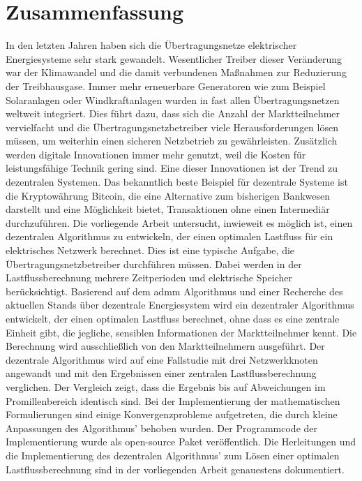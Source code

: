 \section*{Zusammenfassung}

In den letzten Jahren haben sich die Übertragungsnetze elektrischer Energiesysteme sehr stark gewandelt. Wesentlicher Treiber dieser Veränderung war der Klimawandel und die damit verbundenen Maßnahmen zur Reduzierung der Treibhausgase. Immer mehr erneuerbare Generatoren wie zum Beispiel Solaranlagen oder Windkraftanlagen wurden in fast allen Übertragungsnetzen weltweit integriert. Dies führt dazu, dass sich die Anzahl der Marktteilnehmer vervielfacht und die Übertragungsnetzbetreiber viele Herausforderungen lösen müssen, um weiterhin einen sicheren Netzbetrieb zu gewährleisten. Zusätzlich werden digitale Innovationen immer mehr genutzt, weil die Kosten für leistungsfähige Technik gering sind. Eine dieser Innovationen ist der Trend zu dezentralen Systemen. Das bekanntlich beste Beispiel für dezentrale Systeme ist die Kryptowährung Bitcoin, die eine Alternative zum bisherigen Bankwesen darstellt und eine Möglichkeit bietet, Transaktionen ohne einen Intermediär durchzuführen. Die vorliegende Arbeit untersucht, inwieweit es möglich ist, einen dezentralen Algorithmus zu entwickeln, der einen optimalen Lastfluss für ein elektrisches Netzwerk berechnet. Dies ist eine typische Aufgabe, die Übertragungsnetzbetreiber durchführen müssen. Dabei werden in der Lastflussberechnung mehrere Zeitperioden und elektrische Speicher berücksichtigt. Basierend auf dem \gls{admm} Algorithmus und einer Recherche des aktuellen Stands über dezentrale Energiesystem wird ein dezentraler Algorithmus entwickelt, der einen optimalen Lastfluss berechnet, ohne dass es eine zentrale Einheit gibt, die jegliche, sensiblen Informationen der Marktteilnehmer kennt. Die Berechnung wird ausschließlich von den Marktteilnehmern ausgeführt. Der dezentrale Algorithmus wird auf eine Fallstudie mit drei Netzwerkknoten angewandt und mit den Ergebnissen einer zentralen Lastflussberechnung verglichen. Der Vergleich zeigt, dass die Ergebnis bis auf Abweichungen im Promillenbereich identisch sind. Bei der Implementierung der mathematischen Formulierungen sind einige Konvergenzprobleme aufgetreten, die durch kleine Anpassungen des Algorithmus' behoben wurden. Der Programmcode der Implementierung wurde als open-source Paket veröffentlich. Die Herleitungen und die Implementierung des dezentralen Algorithmus' zum Lösen einer optimalen Lastflussberechnung sind in der vorliegenden Arbeit genauestens dokumentiert.